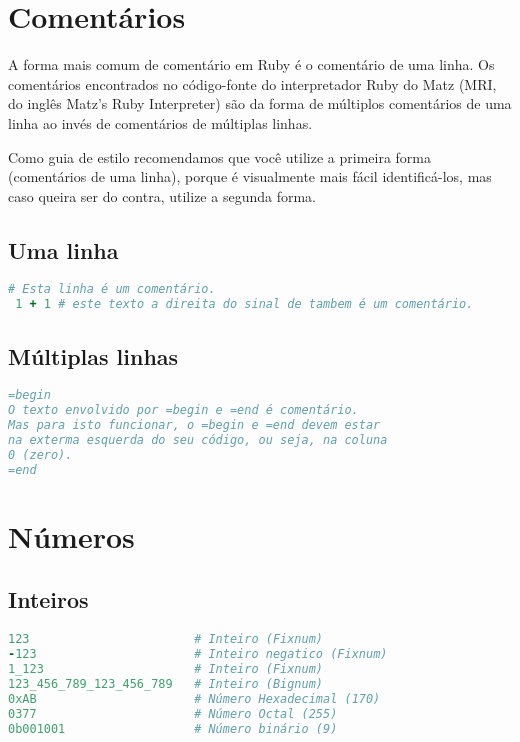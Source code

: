 \documentclass[serif,mathserif]{book}
\begin{document}
\section{Comentários}

A forma mais comum de comentário em Ruby é o comentário de uma linha. Os comentários encontrados no 
código-fonte do interpretador Ruby do Matz (MRI, do inglês Matz's Ruby Interpreter) são da forma de   
múltiplos comentários de uma linha ao invés de comentários de múltiplas linhas.

Como guia de estilo recomendamos que você utilize a primeira forma (comentários de uma linha), porque
é visualmente mais fácil identificá-los, mas caso queira ser do contra, utilize a segunda forma.

\subsection{Uma linha}
\begin{lstlisting}[language=ruby]
 # Esta linha é um comentário.
 1 + 1 # este texto a direita do sinal de tambem é um comentário.
\end{lstlisting}

\subsection{Múltiplas linhas}

\begin{lstlisting}[language=ruby]
=begin
O texto envolvido por =begin e =end é comentário.
Mas para isto funcionar, o =begin e =end devem estar
na exterma esquerda do seu código, ou seja, na coluna
0 (zero).
=end
\end{lstlisting}

\section{Números}

\subsection{Inteiros}

\begin{lstlisting}[language=ruby]
123                       # Inteiro (Fixnum)
-123                      # Inteiro negatico (Fixnum)
1_123                     # Inteiro (Fixnum)
123_456_789_123_456_789   # Inteiro (Bignum)
0xAB                      # Número Hexadecimal (170)
0377                      # Número Octal (255)
0b001001                  # Número binário (9)
\end{lstlisting}
\end{document}
